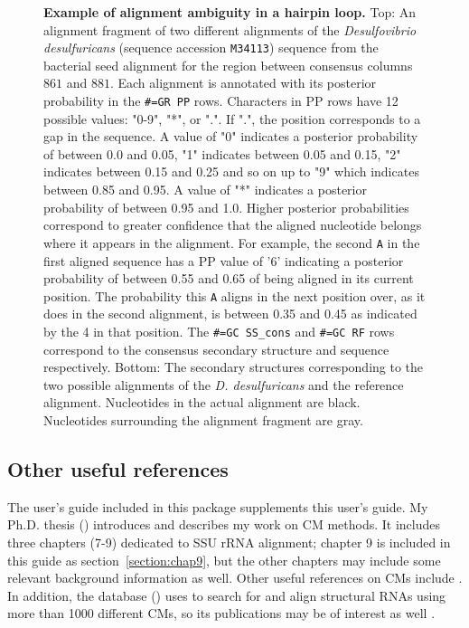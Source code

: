 \begin{figure}
\begin{center}
\caption[Example of alignment ambiguity in a hairpin loop.]{
  \textbf{Example of alignment ambiguity in a hairpin loop.}  Top: An
  alignment fragment of two different alignments of the
  \emph{Desulfovibrio desulfuricans} (sequence accession
  \texttt{M34113}) sequence from the  bacterial seed
  alignment for the region between consensus columns $861$ and $881$.
  Each alignment is annotated with its posterior probability in the
  \texttt{\#=GR PP} rows.  Characters in PP rows have 12 possible
  values: "0-9", "*", or ".". If ".", the position corresponds to a
  gap in the sequence. A value of "0" indicates a posterior
  probability of between 0.0 and 0.05, "1" indicates between 0.05 and
  0.15, "2" indicates between 0.15 and 0.25 and so on up to "9" which
  indicates between 0.85 and 0.95. A value of "*" indicates a
  posterior probability of between 0.95 and 1.0. Higher posterior
  probabilities correspond to greater confidence that the aligned
  nucleotide belongs where it appears in the alignment.  For example,
  the second \texttt{A} in the first aligned sequence has a PP value
  of '6' indicating a posterior probability of between 0.55 and 0.65
  of being aligned in its current position. The
  probability this \texttt{A} aligns in the next position over, as it
  does in the second alignment, is between 0.35 and 0.45 as indicated
  by the 4 in that position.  The \texttt{\#=GC
  SS\_cons} and \texttt{\#=GC RF} rows correspond to the consensus
  secondary structure and sequence respectively.  
  Bottom: The
  secondary structures corresponding to the two possible alignments of
  the \emph{D. desulfuricans} and the reference alignment.  Nucleotides
  in the actual alignment are black. Nucleotides surrounding the
  alignment fragment are gray.}
\end{center}
\label{fig:ambiguity}
\end{figure}


\subsection{Other useful references}

The  user's guide \cite{infernalguide} included in
this package supplements this user's guide. My Ph.D. thesis 
()
introduces and describes my work on CM methods. It includes three chapters (7-9) dedicated to
SSU rRNA alignment; chapter 9 is included in this guide as
section~\ref{section:chap9}, but the other chapters may include some
relevant background information as well. 
Other useful references on CMs include
\cite{Eddy94,Eddy02b,NawrockiEddy07,Nawrocki09,KolbeEddy09}. In
addition, the  database 
()
uses  to search for and align
structural RNAs using more than 1000 different CMs, so its
publications may be of interest as well
\cite{Griffiths-Jones03,Griffiths-Jones05,Gardner09}.


